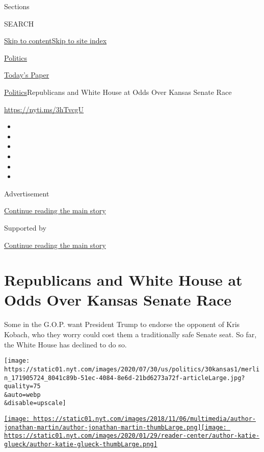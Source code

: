 Sections

SEARCH

\protect\hyperlink{site-content}{Skip to
content}\protect\hyperlink{site-index}{Skip to site index}

\href{https://www.nytimes.com/section/politics}{Politics}

\href{https://myaccount.nytimes.com/auth/login?response_type=cookie\&client_id=vi}{}

\href{https://www.nytimes.com/section/todayspaper}{Today's Paper}

\href{/section/politics}{Politics}\textbar{}Republicans and White House
at Odds Over Kansas Senate Race

\url{https://nyti.ms/3hTvcgU}

\begin{itemize}
\item
\item
\item
\item
\item
\item
\end{itemize}

Advertisement

\protect\hyperlink{after-top}{Continue reading the main story}

Supported by

\protect\hyperlink{after-sponsor}{Continue reading the main story}

\hypertarget{republicans-and-white-house-at-odds-over-kansas-senate-race}{%
\section{Republicans and White House at Odds Over Kansas Senate
Race}\label{republicans-and-white-house-at-odds-over-kansas-senate-race}}

Some in the G.O.P. want President Trump to endorse the opponent of Kris
Kobach, who they worry could cost them a traditionally safe Senate seat.
So far, the White House has declined to do so.

\texttt{[image: https://static01.nyt.com/images/2020/07/30/us/politics/30kansas1/merlin\_171905724\_8041c89b-51ec-4084-8e6d-21bd6273a72f-articleLarge.jpg?quality=75\\\&auto=webp\\\&disable=upscale]}

\href{https://www.nytimes.com/by/jonathan-martin}{\texttt{[image: https://static01.nyt.com/images/2018/11/06/multimedia/author-jonathan-martin/author-jonathan-martin-thumbLarge.png]}}\href{https://www.nytimes.com/by/katie-glueck}{\texttt{[image: https://static01.nyt.com/images/2020/01/29/reader-center/author-katie-glueck/author-katie-glueck-thumbLarge.png]}}

